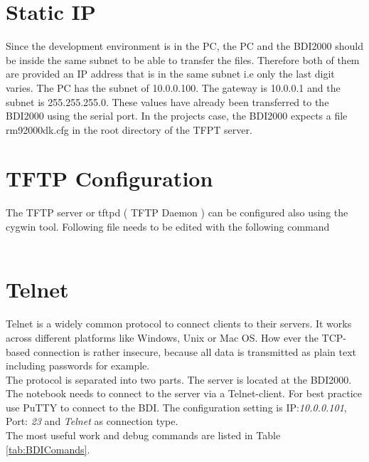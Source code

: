 \section{Static IP} 
Since the development environment is in the PC, the PC and the BDI2000 should be inside the same subnet to be able to transfer the files. Therefore both of them are provided an IP address that is in the same subnet i.e only the last digit varies. The PC has the subnet of 10.0.0.100. The gateway is 10.0.0.1 and the subnet is 255.255.255.0. These values have already been transferred to the BDI2000 using the serial port. In the projects case, the BDI2000 expects a file rm92000dk.cfg in the root directory of the TFPT server. \\

\pagebreak

\section{TFTP Configuration}
The TFTP server or tftpd ( TFTP Daemon ) can be configured also using the cygwin tool. Following file needs to be edited with the following command \\
\\



\section{Telnet} 
\label{TEL}
Telnet is a widely common protocol to connect clients to their servers. It works across different platforms like Windows, Unix or Mac OS. How ever the TCP-based connection is rather insecure, because all data is transmitted as plain text including passwords for example.\\
The protocol is separated into two parts. The server is located at the BDI2000. The notebook needs to connect to the server via a Telnet-client. For best practice use PuTTY to connect to the BDI. The configuration setting is IP:\textit{10.0.0.101}, Port: \textit{23} and \textit{Telnet} as connection type.\\
The most useful work and debug commands are listed in Table \ref{tab:BDIComands}.\\

